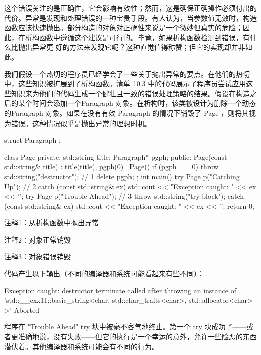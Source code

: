 这个错误关注的是正确性，它会影响有效性；然而，这是确保正确操作必须付出的代价。异常是发现和处理错误的一种宝贵手段。有人认为，当参数值无效时，构造函数应该快速抛出。部分构造的对象对正确性来说是一个微妙但真实的危险；因此，在析构函数中遵循这个建议是可行的。毕竟，如果析构函数检测到错误，有什么比抛出异常更 好的方法来发现它呢？这种直觉值得称赞；但它的实现却并非如此。


我们假设一个热切的程序员已经学会了一些关于抛出异常的要点。在他们的热切中，这些知识被扩展到了析构函数。清单 10.3 中的代码展示了程序员尝试应用这些知识来为他们的代码生成一个健壮且一致的错误处理策略的结果。假设在构造之后的某个时间会添加一个Paragraph 对象。在析构时，该类被设计为删除一个动态的Paragraph 对象。如果在没有有效 Paragraph 的情况下销毁了 Page ，则将其视为错误。这种情况似乎是抛出异常的理想时机。


\begin{cpp}
struct Paragraph {};

class Page {
private:
  std::string title;
  Paragraph* pgph;
public:
  Page(const std::string& title) : title(title), pgph(0) {}
  ~Page() {
    if (pgph == 0)
      throw std::string("destructor"); // 1
    delete pgph;
  }
};
int main() {
  try {
    Page p("Catching Up"); // 2
  } catch (const std::string& ex) {
    std::cout << "Exception caught: " << ex << '\n';
  }
  try {
    Page p("Trouble Ahead"); // 3
    throw std::string("try block");
  } catch (const std::string& ex) {
    std::cout << "Exception caught: " << ex << '\n';
  }
  return 0;
}
\end{cpp}

{\footnotesize
注释1：从析构函数中抛出异常

注释2：对象正常销毁

注释3：对象错误销毁
}

代码产生以下输出（不同的编译器和系统可能看起来有些不同）：

\begin{shell}
Exception caught: destructor terminate called after throwing an instance of 'std::__cxx11::basic_string<char, std::char_traits<char>, std::allocator<char> >'
Aborted
\end{shell}

程序在 "Trouble Ahead" try 块中被毫不客气地终止。第一个 try 块成功了——或者更准确地说，没有失败——但它的执行是一个幸运的意外，允许一些险恶的东西潜伏着。其他编译器和系统可能会有不同的行为。


